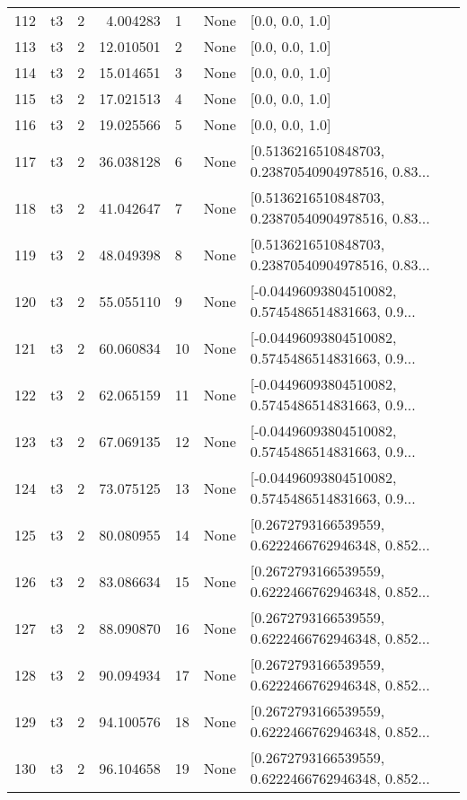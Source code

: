 \begin{tabular}{lllrlll}
112 &  t3 &   2 &    4.004283 &    1 &  None &                                    [0.0, 0.0, 1.0] \\
113 &  t3 &   2 &   12.010501 &    2 &  None &                                    [0.0, 0.0, 1.0] \\
114 &  t3 &   2 &   15.014651 &    3 &  None &                                    [0.0, 0.0, 1.0] \\
115 &  t3 &   2 &   17.021513 &    4 &  None &                                    [0.0, 0.0, 1.0] \\
116 &  t3 &   2 &   19.025566 &    5 &  None &                                    [0.0, 0.0, 1.0] \\
117 &  t3 &   2 &   36.038128 &    6 &  None &  [0.5136216510848703, 0.23870540904978516, 0.83... \\
118 &  t3 &   2 &   41.042647 &    7 &  None &  [0.5136216510848703, 0.23870540904978516, 0.83... \\
119 &  t3 &   2 &   48.049398 &    8 &  None &  [0.5136216510848703, 0.23870540904978516, 0.83... \\
120 &  t3 &   2 &   55.055110 &    9 &  None &  [-0.04496093804510082, 0.5745486514831663, 0.9... \\
121 &  t3 &   2 &   60.060834 &   10 &  None &  [-0.04496093804510082, 0.5745486514831663, 0.9... \\
122 &  t3 &   2 &   62.065159 &   11 &  None &  [-0.04496093804510082, 0.5745486514831663, 0.9... \\
123 &  t3 &   2 &   67.069135 &   12 &  None &  [-0.04496093804510082, 0.5745486514831663, 0.9... \\
124 &  t3 &   2 &   73.075125 &   13 &  None &  [-0.04496093804510082, 0.5745486514831663, 0.9... \\
125 &  t3 &   2 &   80.080955 &   14 &  None &  [0.2672793166539559, 0.6222466762946348, 0.852... \\
126 &  t3 &   2 &   83.086634 &   15 &  None &  [0.2672793166539559, 0.6222466762946348, 0.852... \\
127 &  t3 &   2 &   88.090870 &   16 &  None &  [0.2672793166539559, 0.6222466762946348, 0.852... \\
128 &  t3 &   2 &   90.094934 &   17 &  None &  [0.2672793166539559, 0.6222466762946348, 0.852... \\
129 &  t3 &   2 &   94.100576 &   18 &  None &  [0.2672793166539559, 0.6222466762946348, 0.852... \\
130 &  t3 &   2 &   96.104658 &   19 &  None &  [0.2672793166539559, 0.6222466762946348, 0.852... \\

\end{tabular}
